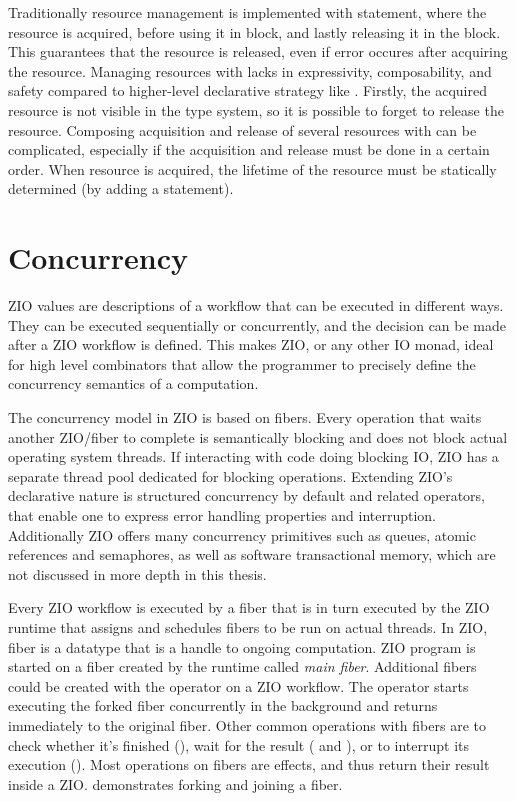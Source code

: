 Traditionally resource management is implemented with  statement, where the resource is acquired, before using it in  block, and lastly releasing it in the  block. This guarantees that the resource is released, even if error occures after acquiring the resource. Managing resources with  lacks in expressivity, composability, and safety compared to higher-level declarative strategy like . Firstly, the acquired resource is not visible in the type system, so it is possible to forget to release the resource. Composing acquisition and release of several resources with  can be complicated, especially if the acquisition and release must be done in a certain order. When resource is acquired, the lifetime of the resource must be statically determined (by adding a  statement).



\section{Concurrency}

ZIO values are descriptions of a workflow that can be executed in different ways. They can be executed sequentially or concurrently, and the decision can be made after a ZIO workflow is defined. This makes ZIO, or any other IO monad, ideal for high level combinators that allow the programmer to precisely define the concurrency semantics of a computation.

The concurrency model in ZIO is based on fibers. Every operation that waits another ZIO/fiber to complete is semantically blocking and does not block actual operating system threads. If interacting with code doing blocking IO, ZIO has a separate thread pool dedicated for blocking operations. Extending ZIO's declarative nature is structured concurrency by default and related operators, that enable one to express error handling properties and interruption. Additionally ZIO offers many concurrency primitives such as queues, atomic references and semaphores, as well as software transactional memory, which are not discussed in more depth in this thesis.

Every ZIO workflow is executed by a fiber that is in turn executed by the ZIO runtime that assigns and schedules fibers to be run on actual threads. In ZIO, fiber is a datatype that is a handle to ongoing computation. ZIO program is started on a fiber created by the runtime called \textit{main fiber}. Additional fibers could be created with the  operator on a ZIO workflow. The  operator starts executing the forked fiber concurrently in the background and returns immediately to the original fiber. Other common operations with fibers are to check whether it's finished (), wait for the result ( and ), or to interrupt its execution (). Most operations on fibers are effects, and thus return their result inside a ZIO.  demonstrates forking and joining a fiber.


